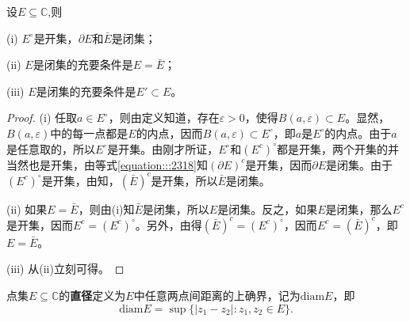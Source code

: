 \documentclass[../../main.tex]{subfiles}%
\begin{document}
\begin{proposition}\label{proposition:开集,闭集的充要条件}
设$E\subseteq \mathbb{C}$,则

(i) \(E^\circ\)是开集，\(\partial E\)和\(\bar{E}\)是闭集；

(ii) \(E\)是闭集的充要条件是\(E = \bar{E}\)；

(iii) \(E\)是闭集的充要条件是\(E' \subset E\)。
\end{proposition}
\begin{proof}
(i) 任取\(a \in E^\circ\)，则由定义知道，存在\(\varepsilon > 0\)，使得\(B(a, \varepsilon) \subset E\)。显然，\(B(a, \varepsilon)\)中的每一点都是\(E\)的内点，因而\(B(a, \varepsilon) \subset E^\circ\)，即\(a\)是\(E^\circ\)的内点。由于\(a\)是任意取的，所以\(E^\circ\)是开集。由刚才所证，\(E^\circ\)和\((E^c)^\circ\)都是开集，两个开集的并当然也是开集，由等式\eqref{equation:::2318}知\((\partial E)^c\)是开集，因而\(\partial E\)是闭集。由于\((E^c)^\circ\)是开集，由知，\((\bar{E})^c\)是开集，所以\(\bar{E}\)是闭集。

(ii) 如果\(E = \bar{E}\)，则由(i)知\(\bar{E}\)是闭集，所以\(E\)是闭集。反之，如果\(E\)是闭集，那么\(E^c\)是开集，因而\(E^c = (E^c)^\circ\)。另外，由得\((\bar{E})^c = (E^c)^\circ\)，因而\(E^c = (\bar{E})^c\)，即\(E = \bar{E}\)。

(iii) 从(ii)立刻可得。 
\end{proof}

\begin{definition}
点集\(E\subseteq \mathbb{C}\)的\textbf{直径}定义为\(E\)中任意两点间距离的上确界，记为\(\mathrm{diam}E\)，即
\[
\mathrm{diam}E = \sup\{ | z_1 - z_2 | : z_1, z_2 \in E \}.
\]
\end{definition}
\end{document}
